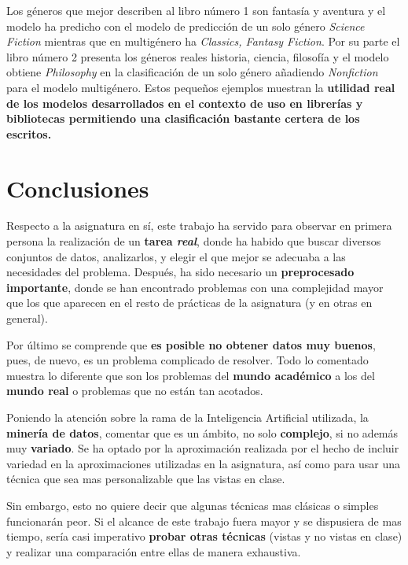 \documentclass[12pt,a4paper, xcolor=table]{article}
\begin{document}
Los géneros que mejor describen al libro número 1 son fantasía y aventura y el modelo ha predicho con el modelo de predicción de un solo género \textit{Science Fiction} mientras que en multigénero ha \textit{Classics, Fantasy Fiction}. Por su parte el libro número 2 presenta los géneros reales historia, ciencia, filosofía y el modelo obtiene \textit{Philosophy} en la clasificación de un solo género añadiendo \textit{Nonfiction} para el modelo multigénero. Estos pequeños ejemplos muestran la\textbf{ utilidad real de los modelos desarrollados en el contexto de uso en librerías y bibliotecas permitiendo una clasificación bastante certera de los escritos.
}

\newpage

\section{Conclusiones}
Respecto a la asignatura en sí, este trabajo ha servido para observar en primera persona la realización de un \textbf{tarea \textit{real}}, donde ha habido que buscar diversos conjuntos de datos, analizarlos, y elegir el que mejor se adecuaba a las necesidades del problema. Después, ha sido necesario un \textbf{preprocesado importante}, donde se han encontrado problemas con una complejidad mayor que los que aparecen en el resto de prácticas de la asignatura (y en otras en general).

\vspace{3mm}

Por último se comprende que \textbf{es posible no obtener datos muy buenos}, pues, de nuevo, es un problema complicado de resolver.  Todo lo comentado muestra lo diferente que son los problemas del \textbf{mundo académico} a los del \textbf{mundo real} o problemas que no están tan acotados.

\vspace{3mm}

Poniendo la atención sobre la rama de la Inteligencia Artificial utilizada, la \textbf{minería de datos}, comentar que es un ámbito, no solo \textbf{complejo}, si no además muy \textbf{variado}. Se ha optado por la aproximación realizada por el hecho de incluir variedad en la aproximaciones utilizadas en la asignatura, así como para usar una técnica que sea mas personalizable que las vistas en clase.

\vspace{3mm}

Sin embargo, esto no quiere decir que algunas técnicas mas clásicas o simples funcionarán peor. Si el alcance de este trabajo fuera mayor y se dispusiera de mas tiempo, sería casi imperativo \textbf{probar otras técnicas} (vistas y no vistas en clase) y realizar una comparación entre ellas de manera exhaustiva.

\clearpage



\end{document}
